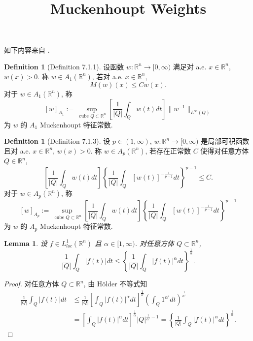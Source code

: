 \documentclass[a4paper,11pt]{article}
\title{Muckenhoupt Weights}
\newtheorem{lemma}[theorem]{Lemma}
\theoremstyle{definition}
\newtheorem{definition}[theorem]{Definition}
\begin{document}
\maketitle

如下内容来自 \cite{g14}.

\begin{definition}[Definition 7.1.1]
    设函数 $ w: \mathbb{R}^n \to [0, \infty) $ 满足对 a.e. $ x \in \mathbb{R}^n $, $ w(x) > 0 $.
    称 $ w \in A_1(\mathbb{R}^n) $, 若对 a.e. $ x \in \mathbb{R}^n $,
    $$
        M(w)(x) \leq C w(x).
    $$
    对于 $ w \in A_1(\mathbb{R}^n) $, 称
    $$
        [w]_{A_1} := \sup_{\text{ cube } Q \subset \mathbb{R}^n} 
            \left[ \frac{1}{|Q|} \int_Q w(t) dt \right] \| w^{-1} \|_{L^\infty (Q)}
    $$
    为 $ w $ 的 $ A_1 $ Muckenhoupt 特征常数.
\end{definition}

\begin{definition}[Definition 7.1.3]
    设 $ p \in (1, \infty) $, $ w: \mathbb{R}^n \to [0, \infty) $ 是局部可积函数 
    且对 a.e. $ x \in \mathbb{R}^n $, $ w(x) > 0 $.
    称 $ w \in A_p(\mathbb{R}^n) $, 若存在正常数 $ C $ 使得对任意方体 $ Q \in \mathbb{R}^n $,
    $$
        \left[ \frac{1}{|Q|} \int_Q w(t) dt \right] 
            \left\{ \frac{1}{|Q|} \int_Q [w(t)]^{-\frac{1}{p-1}}dt \right\}^{p-1} \leq C.
    $$
    对于 $ w \in A_p(\mathbb{R}^n) $, 称
    $$
        [w]_{A_p} := \sup_{\text{ cube } Q \subset \mathbb{R}^n} 
            \left[ \frac{1}{|Q|} \int_Q w(t) dt \right] 
            \left\{ \frac{1}{|Q|} \int_Q [w(t)]^{-\frac{1}{p-1}}dt \right\}^{p-1}
    $$
    为 $ w $ 的 $ A_p $ Muckenhoupt 特征常数.
\end{definition}

\begin{lemma} \label{lemma}
    设 $ f \in L^1_{loc}(\mathbb{R}^n) $ 且 $ \alpha \in [1, \infty) $.
    对任意方体 $ Q \subset \mathbb{R}^n $,
    $$
        \frac{1}{|Q|} \int_Q |f(t)| dt 
            \leq \left\{ \frac{1}{|Q|} \int_Q |f(t)|^\alpha dt \right\}^{\frac{1}{\alpha}}.
    $$
\end{lemma}

\begin{proof}
    对任意方体 $ Q \subset \mathbb{R}^n $, 由 H\"older 不等式知
    \begin{align*}
        \frac{1}{|Q|} \int_Q |f(t)| dt 
            &\leq \frac{1}{|Q|} \left[ \int_Q |f(t)|^\alpha dt \right]^{\frac{1}{\alpha}}
                \left( \int_Q 1^{\alpha'} dt \right)^{\frac{1}{\alpha'}}  \\
            &= \left[ \int_Q |f(t)|^\alpha dt \right]^{\frac{1}{\alpha}} |Q|^{\frac{1}{\alpha'} - 1} 
            = \left\{ \frac{1}{|Q|} \int_Q |f(t)|^\alpha dt \right\}^{\frac{1}{\alpha}}.
    \end{align*}
\end{proof}
\end{document}
